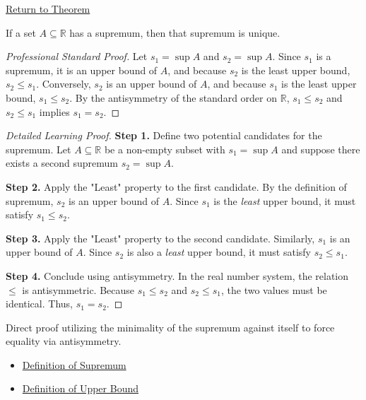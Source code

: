 \newpage
{}
\label{prf:uniqueness-of-the-supremum}

\begin{remark*}[Return]
\hyperref[prop:uniqueness-of-the-supremum]{Return to Theorem}
\end{remark*}

\begin{proposition*}
If a set $A \subseteq \mathbb{R}$ has a supremum, then that supremum is unique.
\end{proposition*}

\begin{proof}[Professional Standard Proof]
\LRAProofBodyStart
Let $s_1 = \sup A$ and $s_2 = \sup A$. Since $s_1$ is a supremum, it is an upper bound of $A$, and because $s_2$ is the least upper bound, $s_2 \le s_1$. Conversely, $s_2$ is an upper bound of $A$, and because $s_1$ is the least upper bound, $s_1 \le s_2$. By the antisymmetry of the standard order on $\mathbb{R}$, $s_1 \le s_2$ and $s_2 \le s_1$ implies $s_1 = s_2$.
\end{proof}

\begin{proof}[Detailed Learning Proof]
\LRAProofBodyStart

\textbf{Step 1.} Define two potential candidates for the supremum.
Let $A \subseteq \mathbb{R}$ be a non-empty subset with $s_1 = \sup A$ and suppose there exists a second supremum $s_2 = \sup A$.

\textbf{Step 2.} Apply the "Least" property to the first candidate.
By the definition of supremum, $s_2$ is an upper bound of $A$. Since $s_1$ is the \textit{least} upper bound, it must satisfy $s_1 \le s_2$.

\textbf{Step 3.} Apply the "Least" property to the second candidate.
Similarly, $s_1$ is an upper bound of $A$. Since $s_2$ is also a \textit{least} upper bound, it must satisfy $s_2 \le s_1$.

\textbf{Step 4.} Conclude using antisymmetry.
In the real number system, the relation $\le$ is antisymmetric. Because $s_1 \le s_2$ and $s_2 \le s_1$, the two values must be identical. Thus, $s_1 = s_2$.
\end{proof}

\begin{remark*}
Direct proof utilizing the minimality of the supremum against itself to force equality via antisymmetry.
\end{remark*}

\begin{remark*}[Dependencies]\hfill
\begin{itemize}
  \item \hyperref[def:supremum]{Definition of Supremum}
  \item \hyperref[def:upper-bound]{Definition of Upper Bound}
\end{itemize}
\end{remark*}

\clearpage
